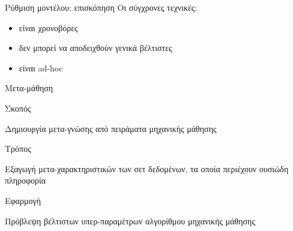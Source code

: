 \documentclass{beamer}
\begin{document}
    \begin{frame} {Ρύθμιση μοντέλου: επισκόπηση}
    Οι σύγχρονες τεχνικές:
    \begin{itemize}
    	\item είναι χρονοβόρες
    	\item δεν μπορεί να αποδειχθούν γενικά βέλτιστες
    	\item είναι ad-hoc
    \end{itemize}
    \end{frame}
  \begin{frame}{Μετα-μάθηση}
  	\begin{minipage}[t]{.3\textwidth}  		
  		Σκοπός
  		\vspace{4ex}
  	\end{minipage}%
  	\begin{minipage}[t]{.6\textwidth}
  		Δημιουργία μετα-γνώσης από πειράματα μηχανικής μάθησης  	
  		\vspace{4ex}
  	\end{minipage}
  	\begin{minipage}[t]{.3\textwidth}  		
  		Τρόπος
  		\vspace{4ex}
  	\end{minipage}%
  	\begin{minipage}[t]{.6\textwidth}
  		Εξαγωγή μετα-χαρακτηριστικών των σετ δεδομένων, τα οποία περιέχουν ουσιώδη πληροφορία
  		\vspace{4ex} 
  	\end{minipage}
  	\begin{minipage}[t]{.3\textwidth}  		
  		Εφαρμογή
  		\vspace{4ex}
  	\end{minipage}%
  	\begin{minipage}[t]{.6\textwidth}
  		Πρόβλεψη βέλτιστων υπερ-παραμέτρων αλγορίθμου μηχανικής μάθησης 
  		\vspace{4ex}
  	\end{minipage}
  	\end{frame}
\end{document}
